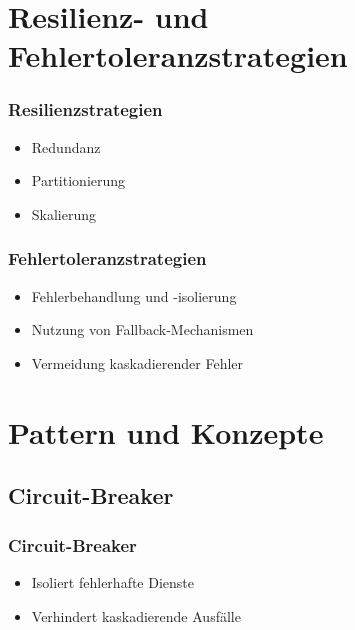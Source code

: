 \section{Resilienz- und Fehlertoleranzstrategien}

\begin{frame}
    \frametitle{Resilienzstrategien}
    \begin{itemize}
        \item Redundanz
        \item Partitionierung
        \item Skalierung
    \end{itemize}
\end{frame}

\begin{frame}
    \frametitle{Fehlertoleranzstrategien}
    \begin{itemize}
        \item Fehlerbehandlung und -isolierung
        \item Nutzung von Fallback-Mechanismen
        \item Vermeidung kaskadierender Fehler
    \end{itemize}
\end{frame}

\section{Pattern und Konzepte}

\subsection{Circuit-Breaker}

\begin{frame}
    \frametitle{Circuit-Breaker}
    \begin{itemize}
        \item Isoliert fehlerhafte Dienste
        \item Verhindert kaskadierende Ausfälle
    \end{itemize}
\end{frame}


